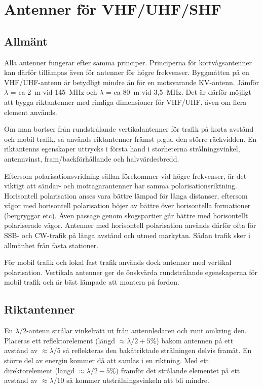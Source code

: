 \section{Antenner för VHF/UHF/SHF}

\subsection{Allmänt}

Alla antenner fungerar efter samma principer. Principerna för
kortvågsantenner kan därför tillämpas även för antenner för högre
frekvenser. Byggmåtten på en VHF/UHF-antenn är betydligt mindre än för
en motsvarande KV-antenn. Jämför \(\lambda\) = ca 2~m vid 145~MHz och
\(\lambda\) = ca 80~m vid 3,5~MHz. Det är därför möjligt att bygga
riktantenner med rimliga dimensioner för VHF/UHF, även om flera
element används.

Om man bortser från rundstrålande vertikalantenner för trafik på korta
avstånd och mobil trafik, så används riktantenner främst p.g.a. den
större räckvidden. En riktantenns egenskaper uttrycks i första hand i
storheterna strålningsvinkel, antennvinst, fram/backförhållande och
halvvärdesbredd.

Eftersom polarisationsvridning sällan förekommer vid högre frekvenser,
är det viktigt att sändar- och mottagarantenner har samma
polarisationsriktning. Horisontell polarisation anses vara bättre
lämpad för långa distanser, eftersom vågor med horisontell
polarisation böjer av bättre över horisontella formationer (bergryggar
etc). Även passage genom skogspartier går bättre med horisontellt
polariserade vågor. Antenner med horisontell polarisation används
därför ofta för SSB- och CW-trafik på långa avstånd och utmed
markytan. Sådan trafik sker i allmänhet från fasta stationer.

För mobil trafik och lokal fast trafik används dock antenner med
vertikal polarisation. Vertikala antenner ger de önskvärda
rundstrålande egenskaperna för mobil trafik och är bäst lämpade att
montera på fordon.

\subsection{Riktantenner}

En \(\lambda/2\)-antenn strålar vinkelrätt ut från antennledaren och
runt omkring den.  Placeras ett reflektorelement (längd
\(\approx\lambda/2 + 5\%\)) bakom antennen på ett avstånd av \(\approx
\lambda/5\) så reflekteras den bakåtriktade strålningen delvis
framåt. En större del av energin kommer då att samlas i en
riktning. Med ett direktorelement (längd \(\approx\lambda/2 - 5\%\))
framför det strålande elementet på ett avstånd av
\(\approx\lambda/10\) så kommer utstrålningsvinkeln att bli mindre.

